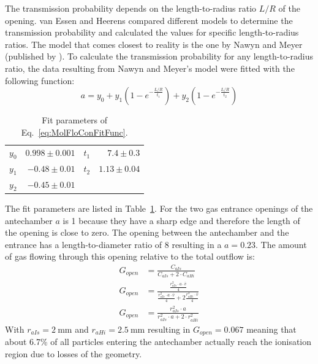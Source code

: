 	The transmission probability depends on the length-to-radius ratio $L/R$ of the opening. van Essen and Heerens \cite{molFlowTubeTransm_Essen1976} compared different models to determine the transmission probability and calculated the values for specific length-to-radius ratios. The model that comes closest to reality is the one by Nawyn and Meyer (published by \cite{molFlowTubeTransm_Essen1976}). To calculate the transmission probability for any length-to-radius ratio, the data resulting from Nawyn and Meyer's model were fitted with the following function:
	\begin{equation}
		a = y_0 + y_1\left(1-e^{-\frac{L/R}{t_1}}\right) + y_2\left(1-e^{-\frac{L/R}{t_2}}\right)
		\label{eq:MolFloConFitFunc}
	\end{equation}
	
	\begin{table}[H]
		\begin{center}
			\begin{tabular}{|l r| l r|}
				\hline
				$y_0$	& $0.998 \pm 0.001$ & $t_1$	& $7.4 \pm 0.3$	\\
				$y_1$	& $-0.48 \pm 0.01$ & $t_2$	& $1.13 \pm 0.04$ \\
				$y_2$ 	& $-0.45 \pm 0.01$	& &\\
				\hline
			\end{tabular}
		\end{center}
		\caption{Fit parameters of Eq.~\eqref{eq:MolFloConFitFunc}.}
		\label{tab:thMolFloConFiPara}
	\end{table}
	The fit parameters are listed in Table~\ref{tab:thMolFloConFiPara}. For the two gas entrance openings of the antechamber $a$ is 1 because they have a sharp edge and therefore the length of the opening is close to zero. 
	The opening between the antechamber and the entrance has a length-to-diameter ratio of 8 resulting in a $a = 0.23$. The amount of gas flowing through this opening relative to the total outflow is:
	\begin{align}
		G_{open} & = \frac{C_{aIs}}{C_{aIs} + 2\cdot C_{aHi}} \label{eq:GAntOpen}\\
		G_{open} & = \frac{\frac{r_{aIs}^2\cdot a\cdot \bar{v}}{4}}{\frac{r_{aIs}^2\cdot a\cdot \bar{v}}{4} + 2\frac{r_{aHi}^2\cdot \bar{v}}{4}}\\
		G_{open} &= \frac{r_{aIs}^2\cdot a}{r_{aIs}^2\cdot a + 2\cdot r_{aHi}^2}
		\label{eq:geoOpenTube}
	\end{align}
	With $r_{aIs} = 2~\si{\milli\meter}$ and $r_{aHi} = 2.5~\si{\milli\meter}$ resulting in $G_{open} = 0.067$ meaning that about 6.7\% of all particles entering the antechamber actually reach the ionisation region due to losses of the geometry.\\

